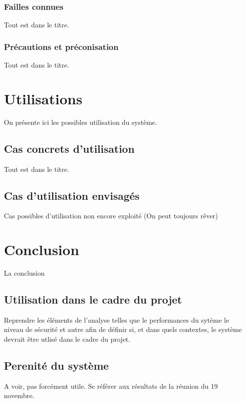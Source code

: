 \documentclass{../res/univ-projet}
\begin{document}
    \subsubsection{Failles connues}
    Tout est dans le titre.
    
    \subsubsection{Précautions et préconisation}
    Tout est dans le titre.
    
\section{Utilisations}
On présente ici les possibles utilisation du système.
  \subsection{Cas concrets d'utilisation}
  Tout est dans le titre.
  
  \subsection{Cas d'utilisation envisagés}
  Cas possibles d'utilisation non encore exploité (On peut toujours r\^ever)
  
\section{Conclusion}
La conclusion
  \subsection{Utilisation dans le cadre du projet}
  Reprendre les éléments de l'analyse telles que le performances du sytème le niveau de sécurité et autre afin de définir si, et dans quels contextes, le système devrait
  \^etre utlisé dans le cadre du projet.
  
  \subsection{Perenité du système}
  A voir, pas forcément utile. Se référer aux résultats de la réunion du 19 novembre.
    
\end{document}
